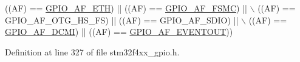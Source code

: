 \begin{DoxyCode}
                          ((AF) == \hyperlink{group___g_p_i_o___alternat__function__selection__define_ga26cf3f30fe5154bd461b27fab58e45e2}{GPIO\_AF\_ETH})       || ((AF) == 
      \hyperlink{group___g_p_i_o___alternat__function__selection__define_ga8378a89ae1a16d5ae5d315ca49a57674}{GPIO\_AF\_FSMC})   || \(\backslash\)
                          ((AF) == GPIO\_AF\_OTG\_HS\_FS) || ((AF) == GPIO\_AF\_SDIO)   || \(\backslash\)
                          ((AF) == \hyperlink{group___g_p_i_o___alternat__function__selection__define_gaa7bfafac663bac5d437bd6d6a2f6774d}{GPIO\_AF\_DCMI})      || ((AF) == 
      \hyperlink{group___g_p_i_o___alternat__function__selection__define_gacd5e7846b3709cddbf41ece2b1fb068e}{GPIO\_AF\_EVENTOUT}))
\end{DoxyCode}


Definition at line 327 of file stm32f4xx\-\_\-gpio.\-h.

